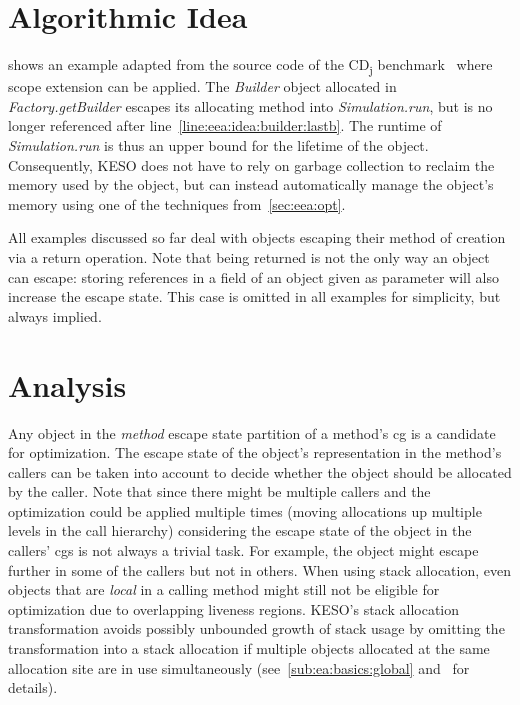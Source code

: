 	\section{Algorithmic Idea}
		\label{sec:eea:idea}

		 shows an example adapted from the source code of the CD\textsubscript{j}
		benchmark~\cite{kalibera:09:jtres} where scope extension can be applied. The \emph{Builder} object allocated in
		\emph{Factory.getBuilder} escapes its allocating method into \emph{Simulation.run}, but is no longer referenced
		after line~\ref{line:eea:idea:builder:lastb}. The runtime of \emph{Simulation.run} is thus an upper bound for the
		lifetime of the object. Consequently, KESO does not have to rely on garbage collection to reclaim the memory used by
		the object, but can instead automatically manage the object's memory using one of the techniques
		from~\cref{sec:eea:opt}.

		All examples discussed so far deal with objects escaping their method of creation via a return operation. Note that
		being returned is not the only way an object can escape: storing references in a field of an object given as
		parameter will also increase the escape state. This case is omitted in all examples for simplicity, but always
		implied.

	\section{Analysis}
		\label{sec:eea:analysis}
		Any object in the \emph{method} escape state partition of a method's \gls{cg} is a candidate for optimization. The
		escape state of the object's representation in the method's callers can be taken into account to decide whether the
		object should be allocated by the caller. Note that since there might be multiple callers and the optimization could
		be applied multiple times (moving allocations up multiple levels in the call hierarchy) considering the escape state
		of the object in the callers' \glspl{cg} is not always a trivial task. For example, the object might escape further
		in some of the callers but not in others. When using stack allocation, even objects that are \emph{local} in
		a calling method might still not be eligible for optimization due to overlapping liveness regions. KESO's stack
		allocation transformation avoids possibly unbounded growth of stack usage by omitting the transformation into
		a stack allocation if multiple objects allocated at the same allocation site are in use simultaneously
		(see~\cref{sub:ea:basics:global} and~\cite[Sec.~3.3]{lang:12} for details).

